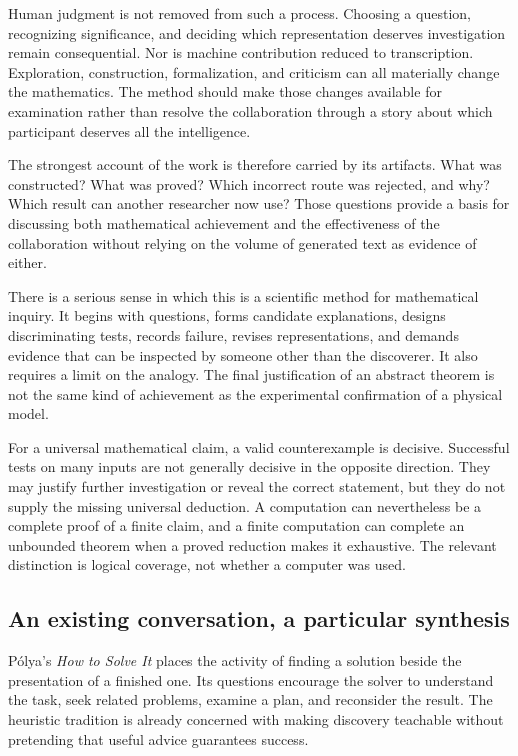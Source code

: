 Human judgment is not removed from such a process. Choosing a question, recognizing significance, and deciding which representation deserves investigation remain consequential. Nor is machine contribution reduced to transcription. Exploration, construction, formalization, and criticism can all materially change the mathematics. The method should make those changes available for examination rather than resolve the collaboration through a story about which participant deserves all the intelligence.

The strongest account of the work is therefore carried by its artifacts. What was constructed? What was proved? Which incorrect route was rejected, and why? Which result can another researcher now use? Those questions provide a basis for discussing both mathematical achievement and the effectiveness of the collaboration without relying on the volume of generated text as evidence of either.


There is a serious sense in which this is a scientific method for mathematical inquiry. It begins with questions, forms candidate explanations, designs discriminating tests, records failure, revises representations, and demands evidence that can be inspected by someone other than the discoverer. It also requires a limit on the analogy. The final justification of an abstract theorem is not the same kind of achievement as the experimental confirmation of a physical model.

For a universal mathematical claim, a valid counterexample is decisive. Successful tests on many inputs are not generally decisive in the opposite direction. They may justify further investigation or reveal the correct statement, but they do not supply the missing universal deduction. A computation can nevertheless be a complete proof of a finite claim, and a finite computation can complete an unbounded theorem when a proved reduction makes it exhaustive. The relevant distinction is logical coverage, not whether a computer was used.

\subsection{An existing conversation, a particular synthesis}

P\'olya's \emph{How to Solve It} places the activity of finding a solution beside the presentation of a finished one. Its questions encourage the solver to understand the task, seek related problems, examine a plan, and reconsider the result. The heuristic tradition is already concerned with making discovery teachable without pretending that useful advice guarantees success.


